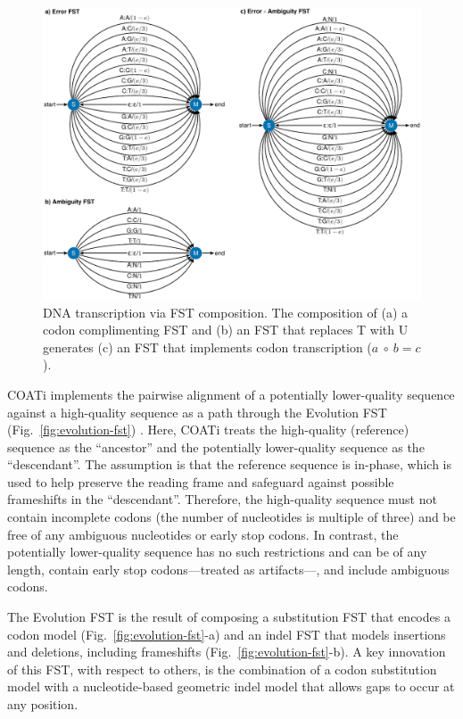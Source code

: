 \documentclass[12pt,letterpaper]{article}
\begin{document}
\begin{figure}[!ht]
    \centering
    \includegraphics[scale=1]{figures/fig-fst-base-calling-new.pdf}
    \caption[DNA Transcription via FST Composition]{DNA transcription via FST composition. The composition of (a) a codon complimenting FST and (b) an FST that replaces T with U generates (c) an FST that implements codon transcription ($a~\circ~b = c$).}
    \label{fig:transcription}
\end{figure}

COATi implements the pairwise alignment of a potentially lower-quality sequence against a high-quality sequence as a path through the Evolution FST (Fig.\ \ref{fig:evolution-fst}) \citep[c.f.][]{holmes2001evolutionary}.
Here, COATi treats the high-quality (reference) sequence as the ``ancestor'' and the potentially lower-quality sequence as the ``descendant''.
The assumption is that the reference sequence is in-phase, which is used to help preserve the reading frame and safeguard against possible frameshifts in the ``descendant''. Therefore, the high-quality sequence must not contain incomplete codons (the number of nucleotides is multiple of three) and be free of any ambiguous nucleotides or early stop codons. In contrast, the potentially lower-quality sequence has no such restrictions and can be of any length, contain early stop codons---treated as artifacts---, and include ambiguous codons.

The Evolution FST is the result of composing a substitution FST that encodes a codon model (Fig.\ \ref{fig:evolution-fst}-a) and an indel FST that models insertions and deletions, including frameshifts (Fig.\ \ref{fig:evolution-fst}-b).
A key innovation of this FST, with respect to others, is the combination of a codon substitution model with a nucleotide-based geometric indel model that allows gaps to occur at any position.
\end{document}

